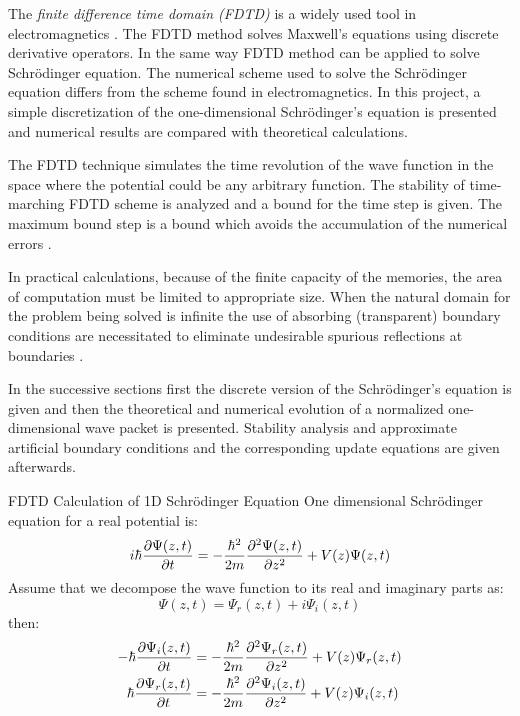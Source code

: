 \begin{homeworkProblem}
The \textit{finite difference time domain (FDTD)} is a widely used tool in electromagnetics \cite{taflove}. The FDTD method solves Maxwell's equations using discrete derivative operators. In the same way FDTD method can be applied to solve Schr\"odinger equation. The numerical scheme used to solve the Schr\"odinger equation differs from the scheme found in electromagnetics. In this project, a simple discretization of the one-dimensional Schr\"odinger's equation is presented and numerical results are compared with theoretical calculations. 

The FDTD technique simulates the time revolution of the wave function in the space where the potential could be any arbitrary function. The stability of time-marching FDTD scheme is analyzed and a bound for the time step is given. The maximum bound step is a bound which avoids the accumulation of the numerical errors \cite{antonio004}.

 In practical calculations, because of the finite capacity of the memories, the area of computation must be limited to appropriate size.  When the natural domain for the problem being solved is infinite the use of absorbing (transparent) boundary conditions are necessitated to eliminate undesirable spurious reflections at boundaries \cite{shibata,kosloff}. 

In the successive sections first the discrete version of the Schr\"odinger's equation is given and then the theoretical and numerical evolution of a normalized one-dimensional wave packet is presented. Stability analysis and approximate artificial boundary conditions and the corresponding update equations are given afterwards. 
\begin{homeworkSection}{FDTD Calculation of 1D Schr\"odinger Equation}
One dimensional Schr\"odinger equation for a real potential is:
\begin{equation}
i\hbar\dfrac{\partial \Psi(z,t)}{\partial t}=-\frac{\hbar^2}{2m}\dfrac{\partial^2 {\Psi(z,t)}}{\partial {z}^2}+V(z)\Psi(z,t)
\end{equation}
Assume that we decompose the wave function to its real and imaginary parts as:
$$\Psi(z,t)=\Psi_r(z,t)+i\Psi_i(z,t)$$
then:
\begin{align}
-\hbar\dfrac{\partial \Psi_i(z,t)}{\partial t}&=-\frac{\hbar^2}{2m}\dfrac{\partial^2 {\Psi_r(z,t)}}{\partial {z}^2}+V(z)\Psi_r(z,t)\label{P5-real}\\
\hbar\dfrac{\partial \Psi_r(z,t)}{\partial t}&=-\frac{\hbar^2}{2m}\dfrac{\partial^2 {\Psi_i(z,t)}}{\partial {z}^2}+V(z)\Psi_i(z,t)\label{P5-imag}
\end{align}


\end{homeworkSection}
\end{homeworkProblem}
